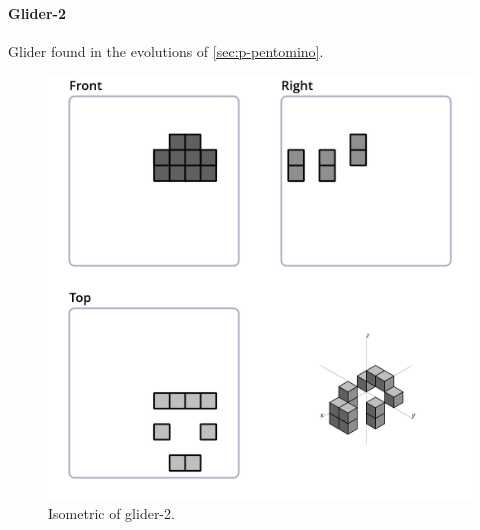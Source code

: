 \paragraph{Glider-2}
Glider found in the evolutions of \ref{sec:p-pentomino}.
\begin{figure}
	\centering
	\includegraphics[scale=0.3]{iso_settings/glider_2.png}
	\caption{Isometric of glider-2.}
  \label{fig:iso-glider-2}
\end{figure}

